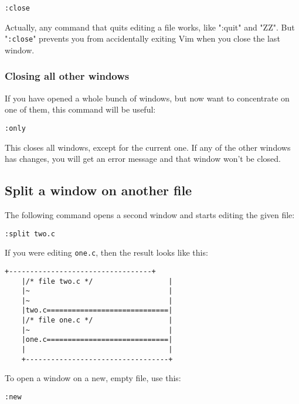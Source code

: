  \begin{Verbatim}[samepage=true]
 :close
 \end{Verbatim}

Actually, any command that quits editing a file works, like ":quit" and "ZZ".
But "\texttt{:close}" prevents you from accidentally exiting Vim when you close the last window.

\subsubsection{Closing all other windows}

If you have opened a whole bunch of windows, but now want to concentrate on one of them, this command will be useful:

 \begin{Verbatim}[samepage=true]
 :only
 \end{Verbatim}

This closes all windows, except for the current one.
If any of the other windows has changes, you will get an error message and that window won't be closed.

\subsection{Split a window on another file}
The following command opens a second window and starts editing the given file:

 \begin{Verbatim}[samepage=true]
 :split two.c
 \end{Verbatim}

If you were editing \texttt{one.c}, then the result looks like this:

\begin{Verbatim}[samepage=true]
    +----------------------------------+
    |/* file two.c */                  |
    |~                                 |
    |~                                 |
    |two.c=============================|
    |/* file one.c */                  |
    |~                                 |
    |one.c=============================|
    |                                  |
    +----------------------------------+
\end{Verbatim}

To open a window on a new, empty file, use this:

 \begin{Verbatim}[samepage=true]
 :new
 \end{Verbatim}

